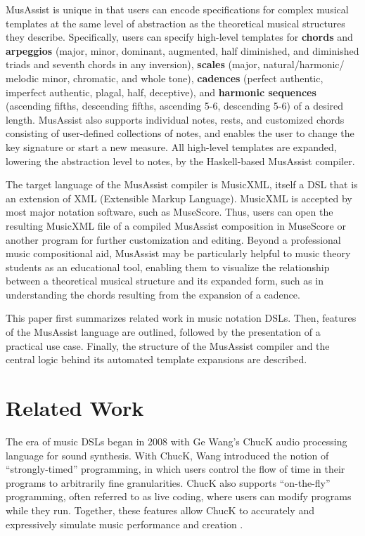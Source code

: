 \documentclass{article}
\begin{document}
MusAssist is unique in that users can encode specifications for complex musical templates at the same level of abstraction as the theoretical musical structures they describe. Specifically,  users can specify high-level templates for 
\textbf{chords} and \textbf{arpeggios} (major, minor, dominant, augmented, half diminished, and diminished triads and seventh chords in any inversion), 
\textbf{scales} (major, natural/harmonic/ melodic minor, chromatic, and whole tone), 
\textbf{cadences} (perfect authentic, imperfect authentic, plagal, half, deceptive), and 
\textbf{harmonic sequences} (ascending fifths, descending fifths, ascending 5-6, descending 5-6) of a desired length. MusAssist also supports individual notes, rests, and customized chords consisting of user-defined collections of notes, and enables the user to change the key signature or start a new measure. All high-level templates are expanded, lowering the abstraction level to notes, by the Haskell-based MusAssist compiler.

The target language of the MusAssist compiler is MusicXML, itself a DSL that is an extension of XML (Extensible Markup Language). MusicXML is accepted by most major notation software, such as MuseScore. Thus, users can open the resulting MusicXML file of a compiled MusAssist composition in MuseScore or another program for further customization and editing. Beyond a professional music compositional aid, MusAssist may be particularly helpful to music theory students as an educational tool, enabling them to visualize the relationship between a theoretical musical structure and its expanded form, such as in understanding the chords resulting from the expansion of a cadence. 

This paper first summarizes related work in music notation DSLs. Then, features of the MusAssist language are outlined, followed by the presentation of a practical use case. Finally, the structure of the MusAssist compiler and the central logic behind its automated template expansions are described. 



\section{Related Work}\label{sec:related_work}

The era of music DSLs began in 2008 with Ge Wang’s ChucK audio processing language for sound synthesis. With ChucK, Wang introduced the notion of ``strongly-timed” programming, in which users control the flow of time in their programs to arbitrarily fine granularities. ChucK also supports ``on-the-fly” programming, often referred to as live coding, where users can modify programs while they run. Together, these features allow ChucK to accurately and expressively simulate music performance and creation \cite{wang_2008}. 
\end{document}
